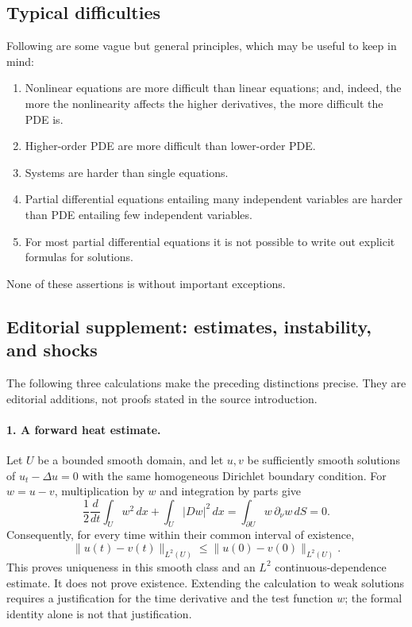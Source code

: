 \subsection{Typical difficulties} Following are some vague but general principles, which may be useful to keep in mind: \begin{enumerate}[label=(\roman*)]
\item Nonlinear equations are more difficult than linear equations; and, indeed, the more the nonlinearity affects the higher derivatives, the more difficult the PDE is.
\item Higher-order PDE are more difficult than lower-order PDE.
\item Systems are harder than single equations.
\item Partial differential equations entailing many independent variables are harder than PDE entailing few independent variables.
\item For most partial differential equations it is not possible to write out explicit formulas for solutions.
\end{enumerate}
None of these assertions is without important exceptions.

\subsection*{Editorial supplement: estimates, instability, and shocks}
The following three calculations make the preceding distinctions precise.
They are editorial additions, not proofs stated in the source introduction.

\paragraph{1. A forward heat estimate.}
Let $U$ be a bounded smooth domain, and let $u,v$ be sufficiently smooth
solutions of $u_t-\Delta u=0$ with the same homogeneous Dirichlet boundary
condition. For $w=u-v$, multiplication by $w$ and integration by parts give
\[
 \frac12\frac{d}{dt}\int_U w^2\,dx
 +\int_U|Dw|^2\,dx
 =\int_{\partial U}w\,\partial_\nu w\,dS=0.
\]
Consequently, for every time within their common interval of existence,
\[
 \|u(t)-v(t)\|_{L^2(U)}\leq\|u(0)-v(0)\|_{L^2(U)}.
\]
This proves uniqueness in this smooth class and an $L^2$ continuous-dependence
estimate. It does not prove existence. Extending the calculation to weak
solutions requires a justification for the time derivative and the test
function $w$; the formal identity alone is not that justification.
\par\Needspace{65mm}


